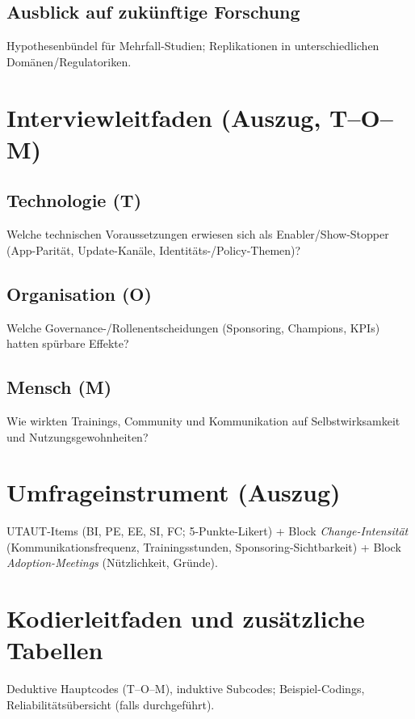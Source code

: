 \documentclass[12pt,a4paper,oneside]{article} %
\begin{document}
\subsection{Ausblick auf zukünftige Forschung}
Hypothesenbündel für Mehrfall-Studien; Replikationen in unterschiedlichen Domänen/Regulatoriken.

\newpage
\appendix
\section{Interviewleitfaden (Auszug, T–O–M)}
\subsection*{Technologie (T)}
Welche technischen Voraussetzungen erwiesen sich als Enabler/Show-Stopper (App-Parität, Update-Kanäle, Identitäts-/Policy-Themen)?\\
\subsection*{Organisation (O)}
Welche Governance-/Rollenentscheidungen (Sponsoring, Champions, KPIs) hatten spürbare Effekte?\\
\subsection*{Mensch (M)}
Wie wirkten Trainings, Community und Kommunikation auf Selbstwirksamkeit und Nutzungsgewohnheiten?

\section{Umfrageinstrument (Auszug)}
UTAUT-Items (BI, PE, EE, SI, FC; 5-Punkte-Likert) + Block \emph{Change-Intensität} (Kommunikationsfrequenz, Trainingsstunden, Sponsoring-Sichtbarkeit) + Block \emph{Adoption-Meetings} (Nützlichkeit, Gründe).

\section{Kodierleitfaden und zusätzliche Tabellen}
Deduktive Hauptcodes (T–O–M), induktive Subcodes; Beispiel-Codings, Reliabilitätsübersicht (falls durchgeführt).
\end{document}
